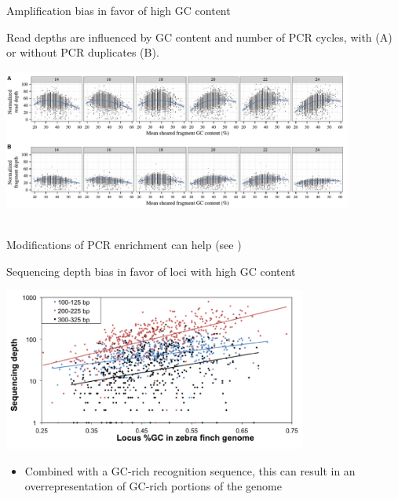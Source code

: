 \documentclass[presentation]{beamer}
\begin{document}
\begin{frame}[label=sec-3-3-2]{Amplification bias in favor of high GC content}
 \begin{center}
Read depths are influenced by GC content and number of PCR cycles, with (A) or without  PCR duplicates (B).

\includegraphics[width=11.5cm]{Davey2013Fig4.png}

 \tiny{\citep{Davey2013}}\\
\normalsize{
Modifications of PCR enrichment can help \tiny{(see \citep{Puritz2014b,Benjamini2012})}}

 \end{center}
\end{frame}
\begin{frame}[label=sec-3-3-3]{Sequencing depth bias in favor of loci with high GC content}
\begin{center}
\includegraphics[width=10cm]{DaCosta2014Fig1c.png}

\tiny{\citep{Dacosta2014}}
\end{center}
\begin{itemize}
\item Combined with a GC-rich recognition sequence, this can result
in an overrepresentation of GC-rich portions of the genome
\end{itemize}
\end{frame}
\end{document}
